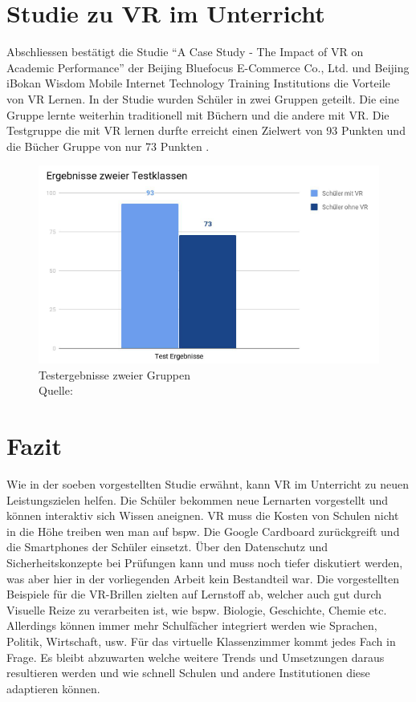 \section{Studie zu VR im Unterricht}
Abschliessen bestätigt die Studie “A Case Study - The Impact of VR on Academic Performance” der Beijing Bluefocus E-Commerce Co., Ltd. und Beijing iBokan Wisdom Mobile Internet Technology Training Institutions die Vorteile von VR Lernen. In der Studie wurden Schüler in zwei Gruppen geteilt. Die eine Gruppe lernte weiterhin traditionell mit Büchern und die andere mit VR. Die Testgruppe die mit VR lernen durfte erreicht einen Zielwert von 93 Punkten und die Bücher Gruppe von nur 73 Punkten  \cite[vgl.][]{htcvive}.

\begin{figure}[ht]
	\centering
	\includegraphics[width=\textwidth,height=\textheight,keepaspectratio]{images/Testergebnisse zweier Gruppen.png}
	\caption{Testergebnisse zweier Gruppen \\ Quelle: \cite[vgl.][]{htcvive}}
	\label{Testergebnisse zweier Gruppen}
\end{figure}

\section{Fazit}
Wie in der soeben vorgestellten Studie erwähnt, kann VR im Unterricht zu neuen Leistungszielen helfen. Die Schüler bekommen neue Lernarten vorgestellt und können interaktiv sich Wissen aneignen. VR muss die Kosten von Schulen nicht in die Höhe treiben wen man auf bspw. Die Google Cardboard zurückgreift und die Smartphones der Schüler einsetzt. Über den Datenschutz und Sicherheitskonzepte bei Prüfungen kann und muss noch tiefer diskutiert werden, was aber hier in der vorliegenden Arbeit kein Bestandteil war. Die vorgestellten Beispiele für die VR-Brillen zielten auf Lernstoff ab, welcher auch gut durch Visuelle Reize zu verarbeiten ist, wie bspw. Biologie, Geschichte, Chemie etc. Allerdings können immer mehr Schulfächer integriert werden wie Sprachen, Politik, Wirtschaft, usw. Für das virtuelle Klassenzimmer kommt jedes Fach in Frage. 
Es bleibt abzuwarten welche weitere Trends und Umsetzungen daraus resultieren werden und wie schnell Schulen und andere Institutionen diese adaptieren können. 